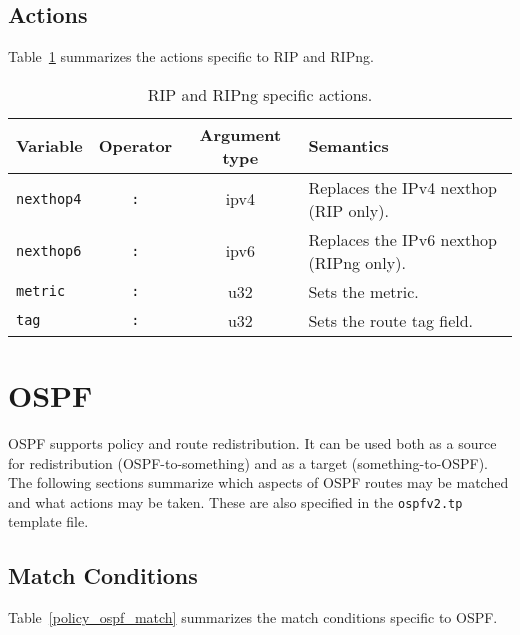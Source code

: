 \subsection{Actions}

Table~\ref{policy_rip_action} summarizes the actions specific to RIP and
RIPng.

\begin{table}[h]
\centering
\begin{tabular}{|l|c|c|p{7cm}|}
\hline
Variable & Operator & Argument type & Semantics \\
\hline
\hline
{\tt nexthop4} & {\tt :} & ipv4 & Replaces the IPv4 nexthop (RIP only).\\

\hline
{\tt nexthop6} & {\tt :} & ipv6 & Replaces the IPv6 nexthop (RIPng only).\\

\hline
{\tt metric} & {\tt :} & u32 & Sets the metric. \\

\hline
{\tt tag} & {\tt :} & u32 & Sets the route tag field. \\
\hline

\end{tabular}
\caption{\label{policy_rip_action}RIP and RIPng specific actions.}
\end{table}

\section{OSPF}
OSPF supports policy and route redistribution.  It can be used both as
a source for redistribution (OSPF-to-something) and as a target
(something-to-OSPF). The following sections summarize which aspects of
OSPF routes may be matched and what actions may be taken. These are
also specified in the {\tt ospfv2.tp} template file.

\subsection{Match Conditions}
Table~\ref{policy_ospf_match} summarizes the match conditions specific to
OSPF.

